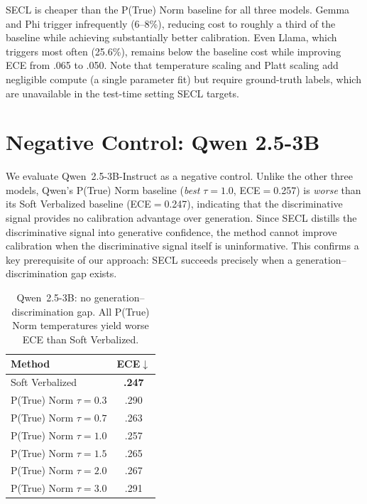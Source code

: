 SECL is cheaper than the P(True) Norm baseline for all three models.
Gemma and Phi trigger infrequently (6--8\%), reducing cost to roughly
a third of the baseline while achieving substantially better calibration.
Even Llama, which triggers most often (25.6\%), remains below the
baseline cost while improving ECE from .065 to .050.
Note that temperature scaling and Platt scaling add negligible compute
(a single parameter fit) but require ground-truth labels, which are 
unavailable in the test-time setting SECL targets.


\section{Negative Control: Qwen 2.5-3B} \label{app:qwen}

We evaluate Qwen~2.5-3B-Instruct as a negative control.
Unlike the other three models, Qwen's P(True) Norm baseline 
(\emph{best} $\tau{=}1.0$, ECE$=$0.257) is \emph{worse} than its
Soft Verbalized baseline (ECE$=$0.247), indicating that the 
discriminative signal provides no calibration advantage over generation.
Since SECL distills the discriminative signal into generative confidence,
the method cannot improve calibration when the discriminative signal 
itself is uninformative.
This confirms a key prerequisite of our approach: SECL succeeds 
precisely when a generation--discrimination gap exists.

\begin{table}[h]
\centering
\caption{Qwen~2.5-3B: no generation--discrimination gap.
All P(True) Norm temperatures yield worse ECE than Soft Verbalized.}
\label{tab:qwen}
\small
\begin{tabular}{@{}lc@{}}
\toprule
\textbf{Method} & \textbf{ECE}$\downarrow$ \\
\midrule
Soft Verbalized & \textbf{.247} \\
\addlinespace
P(True) Norm $\tau{=}0.3$ & .290 \\
P(True) Norm $\tau{=}0.7$ & .263 \\
P(True) Norm $\tau{=}1.0$ & .257 \\
P(True) Norm $\tau{=}1.5$ & .265 \\
P(True) Norm $\tau{=}2.0$ & .267 \\
P(True) Norm $\tau{=}3.0$ & .291 \\
\bottomrule
\end{tabular}
\end{table}


